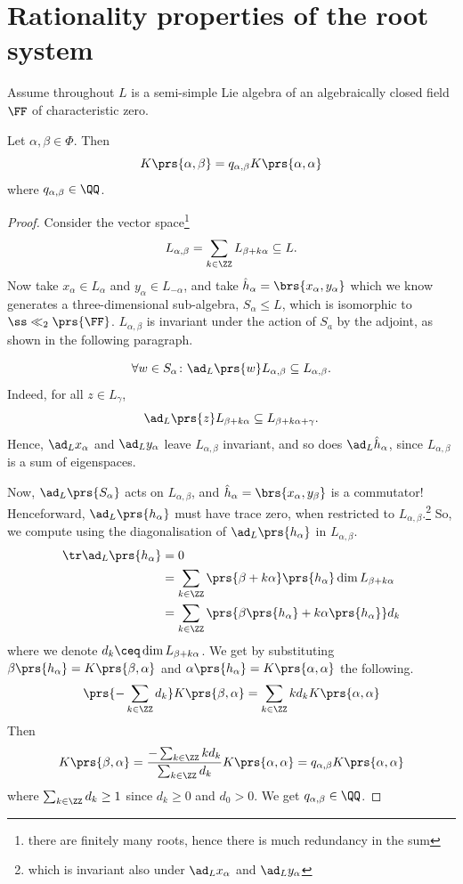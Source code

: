 \documentclass[10pt,a4paper,twoside,openany,hidelinks]{book}
\begin{document}
\section{Rationality properties of the root system}

Assume throughout $L$ is a semi-simple Lie algebra of an algebraically closed field $\FF$ of characteristic zero.

\begin{proposition}
Let $\alpha,\beta \in \Phi$. Then \[K\prs{\alpha,\beta} = q_{\alpha,\beta} K\prs{\alpha,\alpha}\]
where $q_{\alpha,\beta} \in \QQ$.
\end{proposition}

\begin{proof}
Consider the vector space\footnote{there are finitely many roots, hence there is much redundancy in the sum} \[L_{\alpha,\beta} = \sum_{k \in \ZZ} L_{\beta + k\alpha} \subseteq L \text{.}\]
Now take $x_{\alpha} \in L_{\alpha}$ and $y_{\alpha} \in L_{-\alpha}$, and take $\hat{h}_{\alpha} = \brs{x_{\alpha}, y_{\alpha}}$ which we know generates a three-dimensional sub-algebra, $S_{\alpha} \leq L$, which is isomorphic to $\ss\ll_2\prs{\FF}$.
$L_{\alpha,\beta}$ is invariant under the action of $S_a$ by the adjoint, as shown in the following paragraph.

\[\forall w \in S_{\alpha} \colon \ad_L\prs{w}L_{\alpha,\beta} \subseteq L_{\alpha,\beta}\text{.}\]
Indeed, for all $z \in L_{\gamma}$, \[\ad_L\prs{z}L_{\beta + k\alpha} \subseteq L_{\beta + k\alpha + \gamma}\text{.}\]
Hence, $\ad_L x_{\alpha}$ and $\ad_L y_{\alpha}$ leave $L_{\alpha,\beta}$ invariant, and so does $\ad_L \hat{h}_{\alpha}$, since $L_{\alpha,\beta}$ is a sum of eigenspaces.

Now, $\ad_L\prs{S_{\alpha}}$ acts on $L_{\alpha,\beta}$, and $\hat{h}_{\alpha} = \brs{x_{\alpha},y_{\beta}}$ is a commutator!
Henceforward, $\ad_L\prs{h_{\alpha}}$ must have trace zero, when restricted to $L_{\alpha,\beta}$.\footnote{which is invariant also under $\ad_L x_{\alpha}$ and $\ad_L y_{\alpha}$}
So, we compute using the diagonalisation of $\ad_L\prs{h_{\alpha}}$ in $L_{\alpha,\beta}$.
\begin{align*}
\tr \ad_L\prs{h_{\alpha}} &= 0 \\&=
\sum_{k \in \ZZ} \prs{\beta + k\alpha}\prs{h_{\alpha}} \dim L_{\beta + k\alpha} \\&= \sum_{k \in \ZZ} \prs{\beta\prs{h_{\alpha}} + k\alpha\prs{h_{\alpha}}} d_k
\end{align*}
where we denote $d_k \ceq \dim L_{\beta + k\alpha}$.
We get by substituting $\beta\prs{h_{\alpha}} = K\prs{\beta, \alpha}$ and $\alpha\prs{h_{\alpha}} = K\prs{\alpha,\alpha}$ the following.
\[\prs{-\sum_{k\in \ZZ} d_k} K\prs{\beta,\alpha} = \sum_{k \in \ZZ} kd_k K\prs{\alpha,\alpha}\]
Then
\[K\prs{\beta,\alpha} = \frac{-\sum_{k\in\ZZ} k d_k}{\sum_{k \in \ZZ} d_k} K\prs{\alpha,\alpha} = q_{\alpha,\beta} K\prs{\alpha,\alpha}\]
where
$\sum_{k \in \ZZ} d_k \geq 1$
since $d_k \geq 0$ and $d_0 > 0$. We get $q_{\alpha,\beta} \in \QQ$.
\end{proof}
\end{document}
